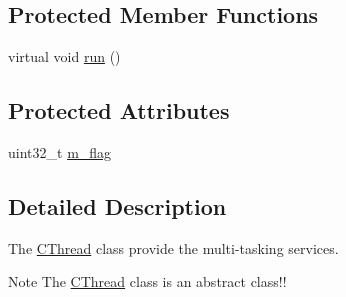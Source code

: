 \subsection*{Protected Member Functions}
\begin{DoxyCompactItemize}
\item 
virtual void \hyperlink{class_c_thread_a071c3d3b3c19a7bd6a01aca073a9b4d7}{run} ()
\end{DoxyCompactItemize}
\subsection*{Protected Attributes}
\begin{DoxyCompactItemize}
\item 
uint32\-\_\-t \hyperlink{class_c_thread_a2723c18f3f7659cdd93610fd1654d564}{m\-\_\-flag}
\end{DoxyCompactItemize}


\subsection{Detailed Description}
The \hyperlink{class_c_thread}{C\-Thread} class provide the multi-\/tasking services. 

\begin{DoxyNote}{Note}
The \hyperlink{class_c_thread}{C\-Thread} class is an abstract class!! 
\end{DoxyNote}


